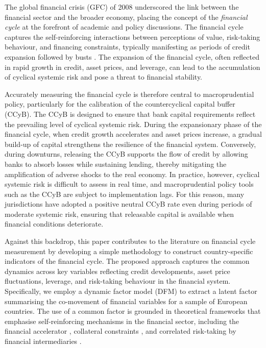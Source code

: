 The global financial crisis (GFC) of 2008 underscored the link between the financial sector and the broader economy, placing the concept of the \textit{financial cycle} at the forefront of academic and policy discussions. The financial cycle captures the self-reinforcing interactions between perceptions of value, risk-taking behaviour, and financing constraints, typically manifesting as periods of credit expansion followed by busts \citep{borio2014financial}. The expansion of the financial cycle, often reflected in rapid growth in credit, asset prices, and leverage, can lead to the accumulation of cyclical systemic risk and pose a threat to financial stability.

Accurately measuring the financial cycle is therefore central to macroprudential policy, particularly for the calibration of the countercyclical capital buffer (CCyB). The CCyB is designed to ensure that bank capital requirements reflect the prevailing level of cyclical systemic risk. During the expansionary phase of the financial cycle, when credit growth accelerates and asset prices increase, a gradual build-up of capital strengthens the resilience of the financial system. Conversely, during downturns, releasing the CCyB supports the flow of credit by allowing banks to absorb losses while sustaining lending, thereby mitigating the amplification of adverse shocks to the real economy. In practice, however, cyclical systemic risk is difficult to assess in real time, and macroprudential policy tools such as the CCyB are subject to implementation lags. For this reason, many jurisdictions have adopted a positive neutral CCyB rate even during periods of moderate systemic risk, ensuring that releasable capital is available when financial conditions deteriorate.

Against this backdrop, this paper contributes to the literature on financial cycle measurement by developing a simple methodology to construct country-specific indicators of the financial cycle. The proposed approach captures the common dynamics across key variables reflecting credit developments, asset price fluctuations, leverage, and risk-taking behaviour in the financial system. Specifically, we employ a dynamic factor model (DFM) to extract a latent factor summarising the co-movement of financial variables for a sample of European countries. The use of a common factor is grounded in theoretical frameworks that emphasise self-reinforcing mechanisms in the financial sector, including the financial accelerator \citep{bernanke1999financial}, collateral constraints \citep{kiyotaki1997credit}, and correlated risk-taking by financial intermediaries \citep{he2013intermediary}.

